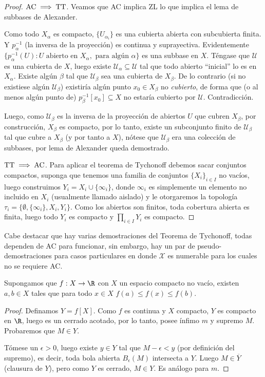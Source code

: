\documentclass[11pt,oneside,a4paper]{book}
\begin{document}
\begin{proof}
$\rm AC\implies TT$. Veamos que AC implica ZL lo que implica el lema de subbases de Alexander.

Como todo $X_\alpha$ es compacto, $\{U_{\alpha_i}\}$ es una cubierta abierta con subcubierta finita. Y $p_\alpha^{-1}$ (la inversa de la proyección) es continua y suprayectiva. Evidentemente $\{p_\alpha^{-1}(U):U\text{ abierto en }X_\alpha,\text{ para algún }\alpha\}$ es una subbase en $X$. Téngase que $\mathcal{U}$ es una cubierta de $X$, luego existe $\mathcal{U}_\alpha\subseteq\mathcal{U}$ tal que todo abierto ``inicial'' lo es en $X_\alpha$. Existe algún $\beta$ tal que $\mathcal{U}_\beta$ sea una cubierta de $X_\beta$. De lo contrario (si no existiese algún $\mathcal{U}_\beta$) existiría algún punto $x_0\in X_\beta$ no \textit{cubierto}, de forma que (o al menos algún punto de) $p_\beta^{-1}[x_0]\subseteq X$ no estaría cubierto por $\mathcal{U}$. Contradicción.

Luego, como $\mathcal{U}_\beta$ es la inversa de la proyección de abiertos $U$ que cubren $X_\beta$, por construcción, $X_\beta$ es compacto, por lo tanto, existe un subconjunto finito de $\mathcal{U}_\beta$ tal que cubre a $X_\beta$ (y por tanto a $X$), nótese que $\mathcal{U}_\beta$ era una colección de subbases, por lema de Alexander queda demostrado.

$\rm TT\implies AC$. Para aplicar el teorema de Tychonoff debemos sacar conjuntos compactos, suponga que tenemos una familia de conjuntos $\{X_i\}_{i\in I}$ no vacíos, luego construimos $Y_i=X_i\cup\{\infty_i\}$, donde $\infty_i$ es simplemente un elemento no incluido en $X_i$ (usualmente llamado aislado) y le otorgaremos la topología $\tau_i=\{\emptyset,\{\infty_i\},X_i,Y_i\}$. Como los abiertos son finitos, toda cobertura abierta es finita, luego todo $Y_i$ es compacto y $\prod_{i\in I}Y_i$ es compacto.
\end{proof}
Cabe destacar que hay varias demostraciones del Teorema de Tychonoff, todas dependen de AC para funcionar, sin embargo, hay un par de pseudo-demostraciones para casos particulares en donde $\mathcal{X}$ es numerable para los cuales no se requiere AC.
\begin{thm}
Supongamos que $f:X\rightarrow\R$ con $X$ un espacio compacto no vacío, existen $a,b\in X$ tales que para todo $x\in X$ $f(a)\leq f(x)\leq f(b)$.
\end{thm}
\begin{proof}
Definamos $Y=f[X]$. Como $f$ es continua y $X$ compacto, $Y$ es compacto en $\R$, luego es un cerrado acotado, por lo tanto, posee ínfimo $m$ y supremo $M$. Probaremos que $M\in Y$.

Tómese un $\epsilon\gt 0$, luego existe $y\in Y$ tal que $M-\epsilon\lt y$ (por definición del supremo), es decir, toda bola abierta $B_\epsilon(M)$ intersecta a $Y$. Luego $M\in\overline{Y}$ (clausura de $Y$), pero como $Y$ es cerrado, $M\in Y$. Es análogo para $m$.
\end{proof}
\end{document}
